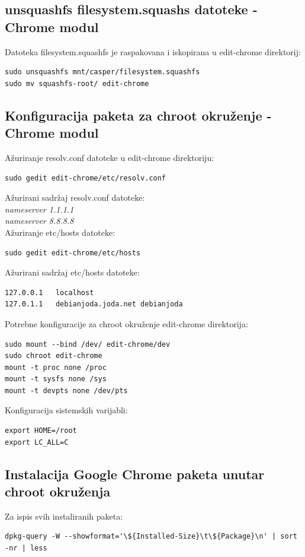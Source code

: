 \documentclass[12pt,vi]{mitthesis}
\begin{document}
\subsection*{unsquashfs filesystem.squashs datoteke - Chrome modul}
\indent
Datoteka filesystem.squashfs je raspakovana i iskopirana u edit-chrome direktorij:\\
\begin{lstlisting}[style=BashInputStyle]
sudo unsquashfs mnt/casper/filesystem.squashfs
sudo mv squashfs-root/ edit-chrome
\end{lstlisting}

\subsection*{Konfiguracija paketa za chroot okruženje - Chrome modul}
\indent
Ažuriranje resolv.conf datoteke u edit-chrome direktoriju:
\begin{lstlisting}[style=BashInputStyle]
sudo gedit edit-chrome/etc/resolv.conf
\end{lstlisting}
Ažurirani sadržaj resolv.conf datoteke:\\
\textit{nameserver 1.1.1.1 \\
nameserver 8.8.8.8}\\
\noindent
Ažuriranje etc/hosts datoteke:
\begin{lstlisting}[style=BashInputStyle]
sudo gedit edit-chrome/etc/hosts
\end{lstlisting}
Ažurirani sadržaj etc/hosts datoteke:
\begin{lstlisting}
127.0.0.1	localhost
127.0.1.1	debianjoda.joda.net	debianjoda
\end{lstlisting}

\noindent
Potrebne konfiguracije za chroot okruženje edit-chrome direktorija:
\begin{lstlisting}[style=BashInputStyle]
sudo mount --bind /dev/ edit-chrome/dev
sudo chroot edit-chrome
mount -t proc none /proc
mount -t sysfs none /sys
mount -t devpts none /dev/pts
\end{lstlisting}
\noindent
Konfiguracija sistemskih varijabli:
\begin{lstlisting}[style=BashInputStyle]
export HOME=/root
export LC_ALL=C
\end{lstlisting}

\subsection*{Instalacija Google Chrome paketa unutar chroot okruženja}
\noindent
Za ispis svih instaliranih paketa:
\begin{lstlisting}[style=BashInputStyle]
dpkg-query -W --showformat='\${Installed-Size}\t\${Package}\n' | sort -nr | less
\end{lstlisting}
\end{document}
